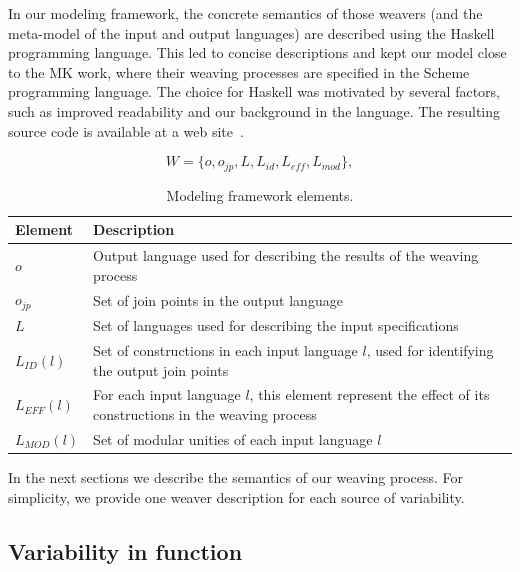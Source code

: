 \documentclass{acm_proc_article-sp}
\begin{document}
In our modeling framework, the concrete semantics of those weavers (and the
meta-model of the input and output languages) are described using the Haskell
programming language. This led to concise descriptions and
kept our model close to the MK work, where their weaving processes are specified
in the Scheme programming language. The choice for Haskell was motivated by
several factors, such as improved readability and our background in the language.
The resulting source code is available at a web site~\cite{SPG:site}.

\begin{equation}
W = \{o, o_{jp}, L, L_{id}, L_{eff}, L_{mod}\},
\label{eq:tuple}
\end{equation}

\begin{table}[h]
\begin{center}
\caption{Modeling framework elements.} \label{tab:tup-01}
\begin{tabular}{|p{0.6in}|p{2.4in}|}
  \hline
  {\bf Element} & {\bf Description} \\
   \hline
  $o$              & Output language used for describing the results of the weaving process \\ \hline
  $o_{jp}$       & Set of join points in the output language \\ \hline
  $L$              & Set of languages used for describing the input specifications \\ \hline
  $L_{ID}(l)$      & Set of constructions in each input language $l$, used for identifying the output join points \\ \hline
  $L_{EFF}(l)$   & For each input language $l$, this element represent the effect of its constructions in the weaving process \\ \hline
  $L_{MOD}(l)$  & Set of modular unities of each input language $l$\\
  \hline
\end{tabular}
\end{center}
\end{table}

In the next sections we describe the semantics of
our weaving process. For simplicity, we provide one weaver
description for each source of variability.

\subsection{Variability in function}\label{sub:pd-weaver}
\end{document}
